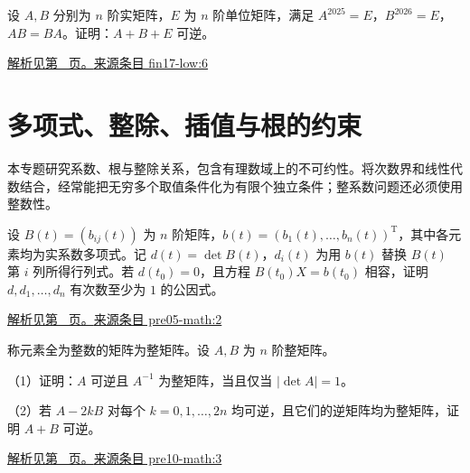 \documentclass[UTF8,12pt,a4paper,fontset=fandol]{ctexart}
\begin{document}
\begin{example}\label{ex:fin17-low:6}

设 $A,B$ 分别为 $n$ 阶实矩阵，$E$ 为 $n$ 阶单位矩阵，满足 $A^{2025}=E$，$B^{2026}=E$，$AB=BA$。证明：$A+B+E$ 可逆。

\par\hyperref[ans:fin17-low:6]{解析见第~\pageref{ans:fin17-low:6} 页。}\quad\href{https://github.com/lzxcr/cmc-mathematics/blob/64916fa1fdbc3e444a652eca204d5669058ee321/src/problems/finals/17/08.md}{来源条目 fin17-low:6}

\end{example}

\section{多项式、整除、插值与根的约束}

\label{sec:questions-4}

本专题研究系数、根与整除关系，包含有理数域上的不可约性。将次数界和线性代数结合，经常能把无穷多个取值条件化为有限个独立条件；整系数问题还必须使用整数性。

\begin{example}\label{ex:pre05-math:2}

设 $B(t)=(b_{ij}(t))$ 为 $n$ 阶矩阵，$b(t)=(b_1(t),\ldots,b_n(t))^{\mathrm T}$，其中各元素均为实系数多项式。记 $d(t)=\det B(t)$，$d_i(t)$ 为用 $b(t)$ 替换 $B(t)$ 第 $i$ 列所得行列式。若 $d(t_0)=0$，且方程 $B(t_0)X=b(t_0)$ 相容，证明 $d,d_1,\ldots,d_n$ 有次数至少为 $1$ 的公因式。

\par\hyperref[ans:pre05-math:2]{解析见第~\pageref{ans:pre05-math:2} 页。}\quad\href{https://github.com/lzxcr/cmc-mathematics/blob/64916fa1fdbc3e444a652eca204d5669058ee321/src/problems/preliminary/05/02.md}{来源条目 pre05-math:2}

\end{example}

\begin{example}\label{ex:pre10-math:3}

称元素全为整数的矩阵为整矩阵。设 $A,B$ 为 $n$ 阶整矩阵。

（1）证明：$A$ 可逆且 $A^{-1}$ 为整矩阵，当且仅当 $|\det A|=1$。

（2）若 $A-2kB$ 对每个 $k=0,1,\ldots,2n$ 均可逆，且它们的逆矩阵均为整矩阵，证明 $A+B$ 可逆。

\par\hyperref[ans:pre10-math:3]{解析见第~\pageref{ans:pre10-math:3} 页。}\quad\href{https://github.com/lzxcr/cmc-mathematics/blob/64916fa1fdbc3e444a652eca204d5669058ee321/src/problems/preliminary/10/03.md}{来源条目 pre10-math:3}

\end{example}
\end{document}
